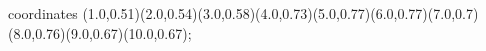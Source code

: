 					coordinates { (1.0,0.51)(2.0,0.54)(3.0,0.58)(4.0,0.73)(5.0,0.77)(6.0,0.77)(7.0,0.7)(8.0,0.76)(9.0,0.67)(10.0,0.67)};
